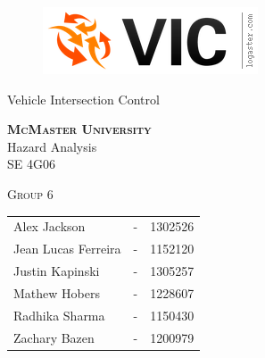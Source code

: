 \documentclass [10pt]{article}
\begin{document}
\begin {center} 

\thispagestyle{empty}
\vspace*{5cm}

\begin {figure}[h!]
\centering
\hspace{-10mm}\includegraphics [scale = .5, trim={.4cm 0 .8cm 0},clip] {figures/vic_logo.png}
\end {figure}

{\fontfamily{\cabinfamily}\selectfont
\Huge{Vehicle Intersection Control} }

\vspace{1 cm}
{\Large\textbf{\textsc{McMaster University}}\\}  \vspace {1cm}
{\Large Hazard Analysis\\ \vspace {0.4 cm} SE 4G06}  \vspace {1cm}

{\large \textsc{Group 6} \\} \vspace{1cm}

\begin{tabular}{ l c  l}
Alex Jackson &-& 1302526\\
Jean Lucas Ferreira &-& 1152120 \\
Justin Kapinski &-& 1305257\\
Mathew Hobers &-& 1228607\\
Radhika Sharma &-& 1150430\\
Zachary Bazen &-& 1200979
\end{tabular}




\end{center}


\pagebreak


\tableofcontents
\listoftables



\pagebreak


\end{document}
